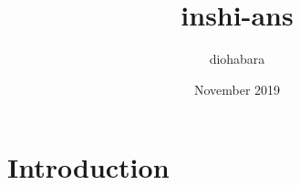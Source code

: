\documentclass{article}
\title{inshi-ans}
\author{diohabara }
\date{November 2019}
\begin{document}
\maketitle

\section{Introduction}
\end{document}
